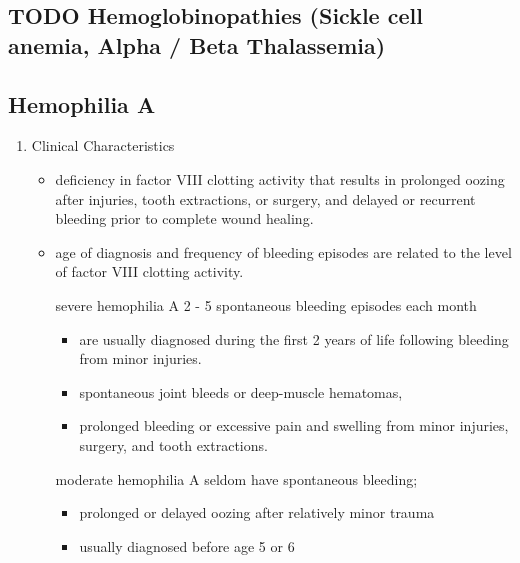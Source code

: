 \documentclass{scrartcl}
\begin{document}
\subsection{{\bfseries\sffamily TODO} Hemoglobinopathies (Sickle cell anemia, Alpha / Beta Thalassemia)}
\label{sec:org13b0dd8}
\subsection{Hemophilia A}
\label{sec:orge8fa035}
\begin{enumerate}
\item Clinical Characteristics
\label{sec:org705c229}
\begin{itemize}
\item deficiency in factor VIII clotting activity that results in
prolonged oozing after injuries, tooth extractions, or surgery, and
delayed or recurrent bleeding prior to complete wound healing.

\item age of diagnosis and frequency of bleeding episodes are related to
the level of factor VIII clotting activity.

\item[{severe hemophilia A}] 2 - 5 spontaneous bleeding episodes each month
\begin{itemize}
\item are usually diagnosed during the first 2 years of life following
bleeding from minor injuries.
\item spontaneous joint bleeds or deep-muscle hematomas,
\item prolonged bleeding or excessive pain and swelling from minor
injuries, surgery, and tooth extractions.
\end{itemize}

\item[{moderate hemophilia A}] seldom have spontaneous bleeding;
\begin{itemize}
\item prolonged or delayed oozing after relatively minor trauma
\item usually diagnosed before age 5 or 6
\end{itemize}


\end{itemize}
\end{enumerate}
\end{document}
